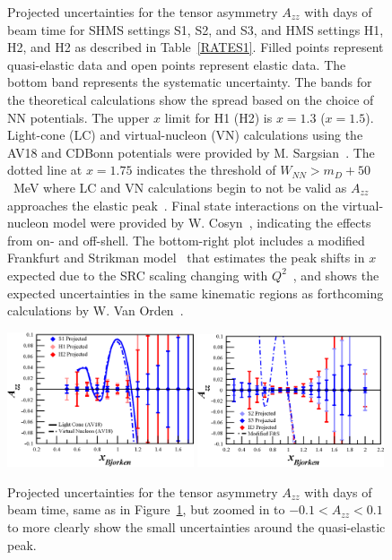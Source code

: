 \begin{figure}
\begin{center}
\caption{\label{PROJ}Projected uncertainties for the tensor asymmetry $A_{zz}$ with \productiondays days of beam time for SHMS settings S1, S2, and S3, and HMS settings H1, H2, and H2 as described in Table~\ref{RATES1}. Filled points represent quasi-elastic data and open points represent elastic data. The bottom band represents the systematic uncertainty. The bands for the theoretical calculations show the spread based on the choice of NN potentials. The upper $x$ limit for H1 (H2) is $x=1.3$ ($x=1.5$). Light-cone (LC) and virtual-nucleon (VN) calculations using the AV18 and CDBonn potentials were provided by M. Sargsian~\cite{Sargsian:2014fla}. The dotted line at $x=1.75$ indicates the threshold of $W_{NN}>m_D+50$~MeV where LC and VN calculations begin to not be valid as $A_{zz}$ approaches the elastic peak~\cite{Frankfurt:1993sp}. Final state interactions on the virtual-nucleon model were provided by W. Cosyn~\cite{cosyn-convo}, indicating the effects from on- and off-shell. The bottom-right plot includes a modified Frankfurt and Strikman model~\cite{Frankfurt:1988nt} that estimates the peak shifts in $x$ expected due to the SRC scaling changing with $Q^2$~\cite{Frankfurt:2008zv}, and shows the expected uncertainties in the same kinematic regions as forthcoming calculations by W. Van Orden~\cite{vanorden-convo}.
}
\end{center}
\end{figure}

\begin{figure}
\begin{center}
\includegraphics[width=0.49\textwidth]{figs/Azz_S1_H1_H2_zoom.eps} 
\includegraphics[width=0.49\textwidth]{figs/Azz_S2_H3_S3_zoom.eps} 
\caption{\label{PROJ-zoom}Projected uncertainties for the tensor asymmetry $A_{zz}$ with \productiondays days of beam time, same as in Figure~\ref{PROJ}, but zoomed in to $-0.1<A_{zz}<0.1$ to more clearly show the small uncertainties around the quasi-elastic peak.
}
\end{center}
\end{figure}

